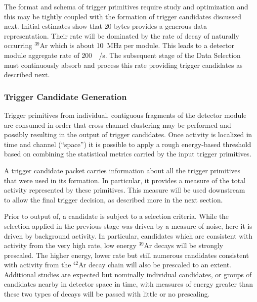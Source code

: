 The format and schema of trigger primitives require study and
optimization and this may be tightly coupled with the formation of
trigger candidates discussed next. 
Initial estimates show that 20 bytes provides a generous data
representation. 
Their rate will be dominated by the rate of decay of naturally occurring
$^{39}$Ar which is about \SI{10}{\mega\hertz} per module.
This leads to a detector module aggregate rate of
\SI{200}{\mega\byte/\second}.
The subsequent stage of the Data Selection must continuously absorb and process this
rate providing trigger candidates as described next.


\subsubsection{Trigger Candidate Generation}

Trigger primitives from individual, contiguous fragments of the detector
module are consumed in order that cross-channel clustering may be
performed and possibly resulting in the output of trigger candidates.
Once activity is localized in time and channel (``space'') it is
possible to apply a rough energy-based threshold based on combining the
statistical metrics carried by the input trigger primitives.

A trigger candidate packet carries information about all the trigger
primitives that were used in its formation. 
In particular, it provides a measure of the total activity represented
by these primitives.
This measure will be used downstream to allow the final trigger
decision, as described more in the next section.

Prior to output of, a candidate is subject to a selection criteria.
While the selection applied in the previous stage was driven by a
measure of noise, here it is driven by background activity.  
In particular, candidates which are consistent with activity from the
very high rate, low energy $^{39}$Ar decays will be strongly prescaled. 
The higher energy, lower rate but still numerous candidates consistent
with activity from the $^{42}$Ar decay chain will also be prescaled to
an extent. 
Additional studies are expected but nominally individual candidates, or
groups of candidates nearby in detector space in time, with measures of
energy greater than these two types of decays will be passed with little
or no prescaling.


